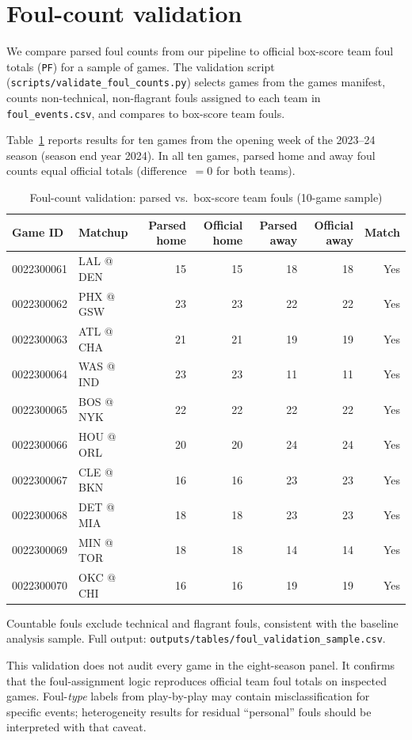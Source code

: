 \label{app:validation}
\section{Foul-count validation}
\label{app:validation:detail}

We compare parsed foul counts from our pipeline to official box-score team foul totals (\texttt{PF}) for a sample of games. The validation script (\texttt{scripts/validate\_foul\_counts.py}) selects games from the games manifest, counts non-technical, non-flagrant fouls assigned to each team in \texttt{foul\_events.csv}, and compares to box-score team fouls.

Table~\ref{tab:validation} reports results for ten games from the opening week of the 2023--24 season (season end year 2024). In all ten games, parsed home and away foul counts equal official totals (difference~$=0$ for both teams).

\begin{table}[htbp]
\centering
\caption{Foul-count validation: parsed vs.\ box-score team fouls (10-game sample)}
\label{tab:validation}
\small
\begin{threeparttable}
\begin{tabular}{llrrrrr}
\toprule
Game ID & Matchup & Parsed home & Official home & Parsed away & Official away & Match \\
\midrule
0022300061 & LAL @ DEN & 15 & 15 & 18 & 18 & Yes \\
0022300062 & PHX @ GSW & 23 & 23 & 22 & 22 & Yes \\
0022300063 & ATL @ CHA & 21 & 21 & 19 & 19 & Yes \\
0022300064 & WAS @ IND & 23 & 23 & 11 & 11 & Yes \\
0022300065 & BOS @ NYK & 22 & 22 & 22 & 22 & Yes \\
0022300066 & HOU @ ORL & 20 & 20 & 24 & 24 & Yes \\
0022300067 & CLE @ BKN & 16 & 16 & 23 & 23 & Yes \\
0022300068 & DET @ MIA & 18 & 18 & 23 & 23 & Yes \\
0022300069 & MIN @ TOR & 18 & 18 & 14 & 14 & Yes \\
0022300070 & OKC @ CHI & 16 & 16 & 19 & 19 & Yes \\
\bottomrule
\end{tabular}
\begin{tablenotes}[flushleft]
\small
\item[] Countable fouls exclude technical and flagrant fouls, consistent with the baseline analysis sample. Full output: \texttt{outputs/tables/foul\_validation\_sample.csv}.
\end{tablenotes}
\end{threeparttable}
\end{table}

This validation does not audit every game in the eight-season panel. It confirms that the foul-assignment logic reproduces official team foul totals on inspected games. Foul-\emph{type} labels from play-by-play may contain misclassification for specific events; heterogeneity results for residual ``personal'' fouls should be interpreted with that caveat.

